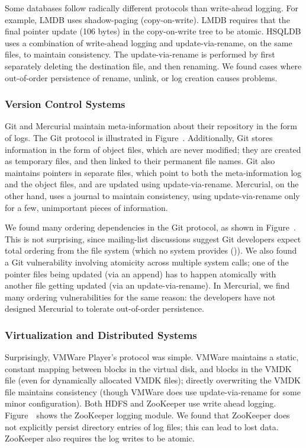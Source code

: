 Some databases follow radically different protocols than write-ahead logging.
For example, LMDB uses shadow-paging (copy-on-write). LMDB requires that the
final pointer update (106 bytes) in the copy-on-write tree to be atomic. HSQLDB
uses a combination of write-ahead logging and update-via-rename, on the same
files, to maintain consistency. The update-via-rename is performed by first
separately deleting the destination file, and then renaming. We found cases
where out-of-order persistence of rename, unlink, or log creation 
causes problems.

\subsubsection{Version Control Systems}

Git and Mercurial maintain meta-information about their repository in the form
of logs. The Git protocol is illustrated in Figure~.
Additionally, Git stores information in the form of object files, which are
never modified; they are created as temporary files, and then linked to their
permanent file names. Git also maintains pointers in separate files, which
point to both the meta-information log and the object files, and are updated
using update-via-rename. Mercurial, on the other hand, uses a journal to
maintain consistency, using update-via-rename only for a few, unimportant
pieces of information.

We found many ordering dependencies in the Git protocol, as shown in
Figure~. This is not surprising, since mailing-list
discussions suggest Git developers expect total ordering from the file system (which no
system provides ()). We also found a Git
vulnerability involving atomicity across multiple system calls; one of the
pointer files being updated (via an append) has to happen atomically with
another file getting updated (via an update-via-rename). In Mercurial, we find
many ordering vulnerabilities for the same reason: the developers have not
designed Mercurial to tolerate out-of-order persistence.

\subsubsection{Virtualization and Distributed Systems} 

Surprisingly, VMWare Player's protocol was simple. VMWare maintains a
static, constant mapping between blocks in the virtual disk, and blocks in the
VMDK file (even for dynamically allocated VMDK files); directly overwriting the VMDK
file maintains consistency (though VMWare does use update-via-rename for some
minor configuration). Both HDFS and ZooKeeper use write ahead logging. 
Figure~\ shows the ZooKeeper logging module. We found that ZooKeeper
does not explicitly persist directory entries of log files; this can lead to lost data.
ZooKeeper also requires the log writes to be atomic.

